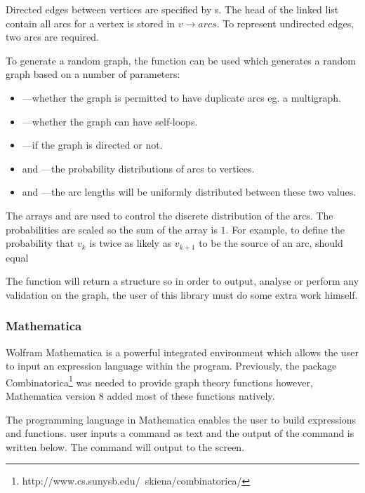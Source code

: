     Directed edges between vertices are specified by s. The head of the linked list contain all arcs for a vertex is stored in $v \to arcs$. To represent undirected edges, two arcs are required. 

    To generate a random graph, the function  can be used which generates a random graph based on a number of parameters:

    \begin{itemize}
    \item {}---whether the graph is permitted to have duplicate arcs eg. a multigraph.
    \item {}---whether the graph can have self-loops.
    \item {}---if the graph is directed or not.
    \item {} and ---the probability distributions of arcs to vertices.
    \item {} and ---the arc lengths will be uniformly distributed between these two values.
    \end{itemize}

    The arrays  and  are used to control the discrete distribution of the arcs. The probabilities are scaled so the sum of the array is $1$. For example, to define the probability that $v_k$ is twice as likely as $v_{k+1}$ to be the source of an arc,  should equal 

    The function will return a  structure so in order to output, analyse or perform any validation on the graph, the user of this library must do some extra work himself.

  \subsubsection{Mathematica}
    Wolfram Mathematica is a powerful integrated environment which allows the user to input an expression language within the program. Previously, the package Combinatorica\footnote{http://www.cs.sunysb.edu/~skiena/combinatorica/} was needed to provide graph theory functions however, Mathematica version 8 added most of these functions natively.

    The programming language in Mathematica enables the user to build expressions and functions. user inputs a command as text and the output of the command is written below. The command  will output  to the screen.

